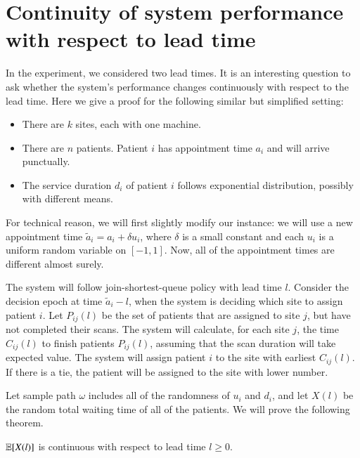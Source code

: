 \section{Continuity of system performance with respect to lead time}

In the experiment, we considered two lead times. It is an interesting question
to ask whether the system's performance changes continuously with respect to
the lead time. Here we give a proof for the following similar but simplified setting:
\begin{itemize}
\item There are $k$ sites, each with one machine.
\item There are $n$ patients. Patient $i$ has appointment time $a_i$
      and will arrive punctually.
\item The service duration $d_i$ of patient $i$ follows exponential
      distribution, possibly with different means.
\end{itemize}
For technical reason, we will first slightly modify our instance:
we will use a new appointment time $\tilde a_i = a_i + \delta u_i$,
where $\delta$ is a small constant and each $u_i$ is a uniform
random variable on $[-1,1]$. Now, all of the appointment times
are different almost surely.

The system will follow join-shortest-queue policy with lead time $l$.
Consider the decision epoch at time $\tilde a_i - l$, when the
system is deciding which site to assign patient $i$.
Let $P_{ij}(l)$ be the set of patients that are assigned to site $j$,
but have not completed their scans.
The system will calculate, for each site $j$, the time $C_{ij}(l)$ to finish patients $P_{ij}(l)$,
assuming that the scan duration will take expected value. The system
will assign patient $i$ to the site with earliest $C_{ij}(l)$.
If there is a tie, the patient will be assigned to the site with
lower number.

Let sample path $\omega$ includes all of the randomness of $u_i$ and $d_i$,
and let $X(l)$ be the random total waiting time of all of the patients.
We will prove the following theorem.

\begin{thm}
  $\operatorname*{\mathbb{E}}[X(l)]$ is continuous with respect to lead time $l \ge 0$.
\end{thm}

